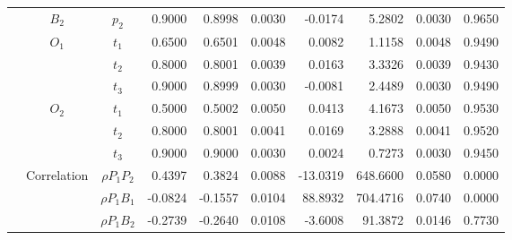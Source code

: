 \documentclass[letterpaper]{article}
\begin{document}
\begin{table}[h]
\begin{tabular}{cccrrrrrrr}
            & $B_2$       & $p_2$          & 0.9000                 & 0.8998                 & 0.0030                 & -0.0174                & 5.2802                 & 0.0030                   & 0.9650                 \\
            & $O_1$       & $t_1$          & 0.6500                 & 0.6501                 & 0.0048                 & 0.0082                 & 1.1158                 & 0.0048                   & 0.9490                 \\
            &             & $t_2$          & 0.8000                 & 0.8001                 & 0.0039                 & 0.0163                 & 3.3326                 & 0.0039                   & 0.9430                 \\
            &             & $t_3$          & 0.9000                 & 0.8999                 & 0.0030                 & -0.0081                & 2.4489                 & 0.0030                   & 0.9490                 \\
            & $O_2$       & $t_1$          & 0.5000                 & 0.5002                 & 0.0050                 & 0.0413                 & 4.1673                 & 0.0050                   & 0.9530                 \\
            &             & $t_2$          & 0.8000                 & 0.8001                 & 0.0041                 & 0.0169                 & 3.2888                 & 0.0041                   & 0.9520                 \\
            &             & $t_3$          & 0.9000                 & 0.9000                 & 0.0030                 & 0.0024                 & 0.7273                 & 0.0030                   & 0.9450                 \\
            & Correlation & $\rho{P_1P_2}$ & 0.4397                 & 0.3824                 & 0.0088                 & -13.0319               & 648.6600               & 0.0580                   & 0.0000                 \\
            &             & $\rho{P_1B_1}$ & -0.0824                & -0.1557                & 0.0104                 & 88.8932                & 704.4716               & 0.0740                   & 0.0000                 \\
            &             & $\rho{P_1B_2}$ & -0.2739                & -0.2640                & 0.0108                 & -3.6008                & 91.3872                & 0.0146                   & 0.7730                 \\

\end{tabular}
\end{table}
\end{document}

